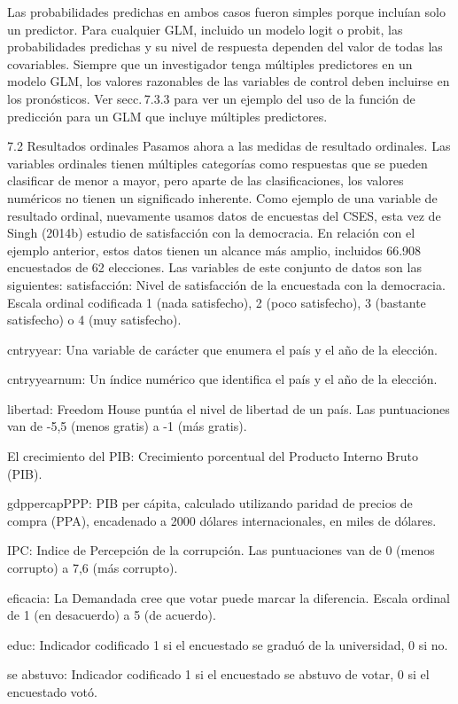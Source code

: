 \documentclass[
]{book}
\begin{document}
Las probabilidades predichas en ambos casos fueron simples porque incluían solo un predictor. Para cualquier GLM, incluido un modelo logit o probit, las probabilidades predichas y su nivel de respuesta dependen del valor de todas las covariables. Siempre que un investigador tenga múltiples predictores en un modelo GLM, los valores razonables de las variables de control deben incluirse en los pronósticos. Ver secc. 7.3.3 para ver un ejemplo del uso de la función de predicción para un GLM que incluye múltiples predictores.

7.2 Resultados ordinales
Pasamos ahora a las medidas de resultado ordinales. Las variables ordinales tienen múltiples categorías como respuestas que se pueden clasificar de menor a mayor, pero aparte de las clasificaciones, los valores numéricos no tienen un significado inherente. Como ejemplo de una variable de resultado ordinal, nuevamente usamos datos de encuestas del CSES, esta vez de Singh (2014b) estudio de satisfacción con la democracia. En relación con el ejemplo anterior, estos datos tienen un alcance más amplio, incluidos 66.908 encuestados de 62 elecciones. Las variables de este conjunto de datos son las siguientes:
satisfacción:
Nivel de satisfacción de la encuestada con la democracia. Escala ordinal codificada 1 (nada satisfecho), 2 (poco satisfecho), 3 (bastante satisfecho) o 4 (muy satisfecho).

cntryyear:
Una variable de carácter que enumera el país y el año de la elección.

cntryyearnum:
Un índice numérico que identifica el país y el año de la elección.

libertad:
Freedom House puntúa el nivel de libertad de un país. Las puntuaciones van de -5,5 (menos gratis) a -1 (más gratis).

El crecimiento del PIB:
Crecimiento porcentual del Producto Interno Bruto (PIB).

gdppercapPPP:
PIB per cápita, calculado utilizando paridad de precios de compra (PPA), encadenado a 2000 dólares internacionales, en miles de dólares.

IPC:
Indice de Percepción de la corrupción. Las puntuaciones van de 0 (menos corrupto) a 7,6 (más corrupto).

eficacia:
La Demandada cree que votar puede marcar la diferencia. Escala ordinal de 1 (en desacuerdo) a 5 (de acuerdo).

educ:
Indicador codificado 1 si el encuestado se graduó de la universidad, 0 si no.

se abstuvo:
Indicador codificado 1 si el encuestado se abstuvo de votar, 0 si el encuestado votó.
\end{document}
